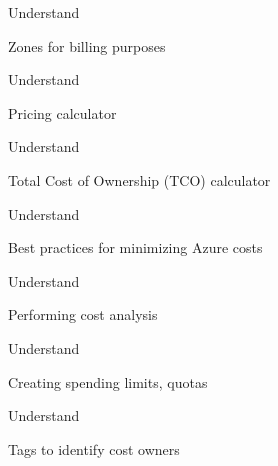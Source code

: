 \documentclass{scrartcl}
\newenvironment{flashcard}[2][]{%
    #1
    \vfill
    \centerline{\Large{#2}}
    \vfill
    \newpage
}
{\newpage}
\begin{document}
    \begin{flashcard}[Understand]{Zones for billing purposes}

    \end{flashcard}

    \begin{flashcard}[Understand]{Pricing calculator}

    \end{flashcard}

    \begin{flashcard}[Understand]{Total Cost of Ownership (TCO) calculator}

    \end{flashcard}

    \begin{flashcard}[Understand]{Best practices for minimizing Azure costs}

    \end{flashcard}

    \begin{flashcard}[Understand]{Performing cost analysis}

    \end{flashcard}

    \begin{flashcard}[Understand]{Creating spending limits, quotas}

    \end{flashcard}

    \begin{flashcard}[Understand]{Tags to identify cost owners}

    \end{flashcard}
\end{document}
